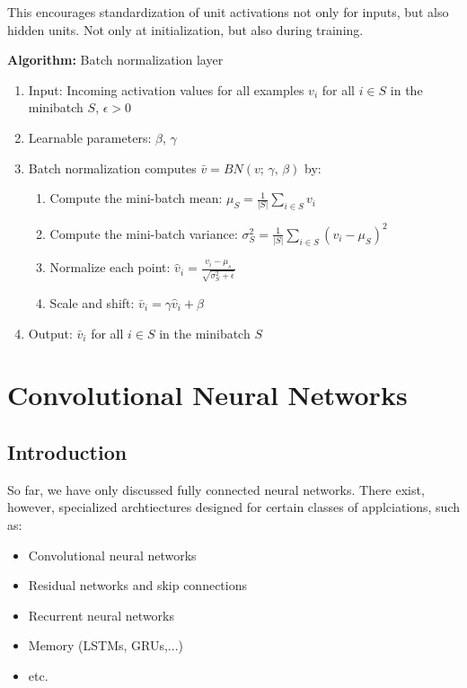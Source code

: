 \documentclass[a4paper]{extarticle}
\begin{document}
This encourages standardization of unit activations not only for inputs, but also hidden units. Not only at initialization, but also during training.

\begin{cbox}
    \textbf{Algorithm:} Batch normalization layer
    \begin{enumerate}
        \item Input: Incoming activation values for all examples $v_i$ for all $i \in S$ in the minibatch $S$, $\epsilon > 0$
        \item Learnable parameters: $\beta, \, \gamma$
        \item Batch normalization computes $\bar{v} = BN(v; \, \gamma, \, \beta)$ by:
        \begin{enumerate}
            \item Compute the mini-batch mean: $\mu_S = \frac{1}{|S|} \sum_{i \in S}v_i$
            \item Compute the mini-batch variance: $\sigma_S^2 = \frac{1}{|S|} \sum_{i \in S} (v_i - \mu_S)^2$
            \item Normalize each point: $\hat{v}_i = \frac{v_i - \mu_s}{\sqrt{\sigma_S^2 + \epsilon}}$
            \item Scale and shift: $\bar{v}_i = \gamma \hat{v}_i + \beta$
        \end{enumerate}
        \item Output: $\bar{v}_i$ for all $i \in S$ in the minibatch $S$
    \end{enumerate}
\end{cbox}

\section{Convolutional Neural Networks}

\subsection{Introduction}

So far, we have only discussed fully connected neural networks. There exist, however, specialized archtiectures designed for certain classes of applciations, such as:
\begin{itemize}
    \item Convolutional neural networks
    \item Residual networks and skip connections
    \item Recurrent neural networks
    \item Memory (LSTMs, GRUs,...)
    \item etc.
\end{itemize}
\end{document}
